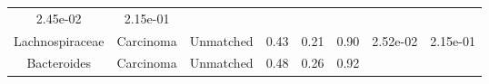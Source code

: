 \documentclass[12pt,]{article}
\begin{document}
\begin{longtable}[]{@{}cccccccc@{}}
\begin{minipage}[t]{0.06\columnwidth}
2.45e-02\strut
\end{minipage} & \begin{minipage}[t]{0.06\columnwidth}\centering\strut
2.15e-01\strut
\end{minipage}\tabularnewline
\begin{minipage}[t]{0.18\columnwidth}\centering\strut
Lachnospiraceae\strut
\end{minipage} & \begin{minipage}[t]{0.07\columnwidth}\centering\strut
Carcinoma\strut
\end{minipage} & \begin{minipage}[t]{0.09\columnwidth}\centering\strut
Unmatched\strut
\end{minipage} & \begin{minipage}[t]{0.03\columnwidth}\centering\strut
0.43\strut
\end{minipage} & \begin{minipage}[t]{0.14\columnwidth}\centering\strut
0.21\strut
\end{minipage} & \begin{minipage}[t]{0.14\columnwidth}\centering\strut
0.90\strut
\end{minipage} & \begin{minipage}[t]{0.06\columnwidth}\centering\strut
2.52e-02\strut
\end{minipage} & \begin{minipage}[t]{0.06\columnwidth}\centering\strut
2.15e-01\strut
\end{minipage}\tabularnewline
\begin{minipage}[t]{0.18\columnwidth}\centering\strut
Bacteroides\strut
\end{minipage} & \begin{minipage}[t]{0.07\columnwidth}\centering\strut
Carcinoma\strut
\end{minipage} & \begin{minipage}[t]{0.09\columnwidth}\centering\strut
Unmatched\strut
\end{minipage} & \begin{minipage}[t]{0.03\columnwidth}\centering\strut
0.48\strut
\end{minipage} & \begin{minipage}[t]{0.14\columnwidth}\centering\strut
0.26\strut
\end{minipage} & \begin{minipage}[t]{0.14\columnwidth}\centering\strut
0.92\strut
\end{minipage} & \begin{minipage}[t]{0.06\columnwidth}\centering\strut

\end{minipage}
\end{longtable}
\end{document}
